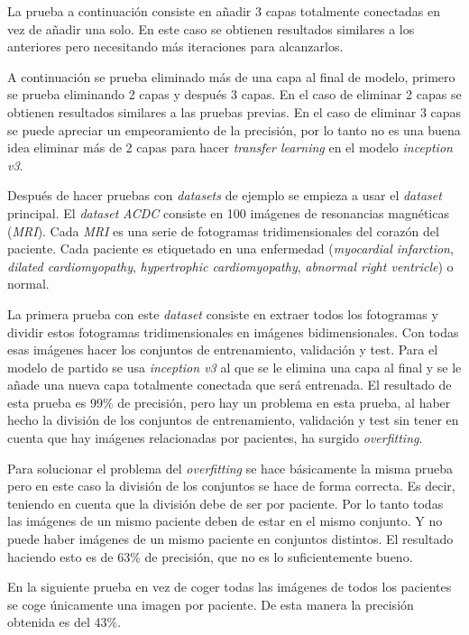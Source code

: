 \documentclass[12pt,a4paper]{article}
\begin{document}
La prueba a continuación consiste en añadir 3 capas totalmente conectadas en vez de añadir una solo. En este caso se obtienen resultados similares a los anteriores pero necesitando más iteraciones para alcanzarlos.
\bigskip

A continuación se prueba eliminado más de una capa al final de modelo, primero se prueba eliminando 2 capas y después 3 capas. En el caso de eliminar 2 capas se obtienen resultados similares a las pruebas previas. En el caso de eliminar 3 capas se puede apreciar un empeoramiento de la precisión, por lo tanto no es una buena idea eliminar más de 2 capas para hacer \textit{transfer learning} en el modelo \textit{inception v3}.
\bigskip

Después de hacer pruebas con \textit{datasets} de ejemplo se empieza a usar el \textit{dataset} principal. El \textit{dataset} \textit{ACDC} consiste en 100 imágenes de resonancias magnéticas (\textit{MRI}). Cada \textit{MRI} es una serie de fotogramas tridimensionales del corazón del paciente. Cada paciente es etiquetado en una enfermedad (\textit{myocardial infarction}, \textit{dilated cardiomyopathy}, \textit{hypertrophic cardiomyopathy}, \textit{abnormal right ventricle}) o normal.
\bigskip

La primera prueba con este \textit{dataset} consiste en extraer todos los fotogramas y dividir estos fotogramas tridimensionales en imágenes bidimensionales. Con todas esas imágenes hacer los conjuntos de entrenamiento, validación y test. Para el modelo de partido se usa \textit{inception v3} al que se le elimina una capa al final y se le añade una nueva capa totalmente conectada que será entrenada. El resultado de esta prueba es 99\% de precisión, pero hay un problema en esta prueba, al haber hecho la división de los conjuntos de entrenamiento, validación y test sin tener en cuenta que hay imágenes relacionadas por pacientes, ha surgido \textit{overfitting}.
\bigskip

Para solucionar el problema del \textit{overfitting} se hace básicamente la misma prueba pero en este caso la división de los conjuntos se hace de forma correcta. Es decir, teniendo en cuenta que la división debe de ser por paciente. Por lo tanto todas las imágenes de un mismo paciente deben de estar en el mismo conjunto. Y no puede haber imágenes de un mismo paciente en conjuntos distintos. El resultado haciendo esto es de 63\% de precisión, que no es lo suficientemente bueno.
\bigskip

En la siguiente prueba en vez de coger todas las imágenes de todos los pacientes se coge únicamente una imagen por paciente. De esta manera la precisión obtenida es del 43\%.
\bigskip
\end{document}
